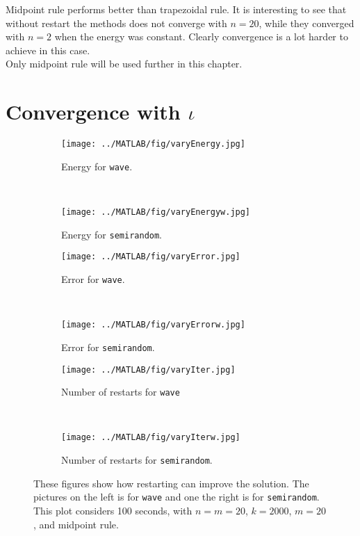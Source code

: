 Midpoint rule performs better than trapezoidal rule. It is interesting to see that without restart the methods does not converge with $n = 20$, while they converged with $n = 2$ when the energy was constant. Clearly convergence is a lot harder to achieve in this case. \\
Only midpoint rule will be used further in this chapter.\\

\section{Convergence with $\iota$} %

\begin{figure}[H]
        \centering
        \begin{subfigure}[b]{0.45\textwidth}
                \texttt{[image: ../MATLAB/fig/varyEnergy.jpg]}
                \caption{ Energy for \texttt{wave}. }
                \label{fig:varyEnergy}
        \end{subfigure}%
        ~
        \begin{subfigure}[b]{0.45\textwidth}
                \texttt{[image: ../MATLAB/fig/varyEnergyw.jpg]}
                \caption{ Energy for \texttt{semirandom}. }
                \label{fig:varyEnergyw}
        \end{subfigure}
		
		\begin{subfigure}[b]{0.45\textwidth}
                \texttt{[image: ../MATLAB/fig/varyError.jpg]}
                \caption{ Error for \texttt{wave}. }
                \label{fig:varyError}
        \end{subfigure}%
        ~
        \begin{subfigure}[b]{0.45\textwidth}
                \texttt{[image: ../MATLAB/fig/varyErrorw.jpg]}
                \caption{ Error for \texttt{semirandom}. }
                \label{fig:varyErrorw}
        \end{subfigure}
        
        		\begin{subfigure}[b]{0.45\textwidth}
                \texttt{[image: ../MATLAB/fig/varyIter.jpg]}
                \caption{ Number of restarts for \texttt{wave} }
                \label{fig:varyIter}
        \end{subfigure}%
        ~
        \begin{subfigure}[b]{0.45\textwidth}
                \texttt{[image: ../MATLAB/fig/varyIterw.jpg]}
                \caption{ Number of restarts for \texttt{semirandom}. }
                \label{fig:varyIterw}
        \end{subfigure}
        \caption{ These figures show how restarting can improve the solution. The pictures on the left is for \texttt{wave} and one the right is for \texttt{semirandom}. This plot considers 100 seconds, with  $n=m=20$, $k = 2000$, $m = 20$, and midpoint rule. }
        \label{fig:variota}
\end{figure}
